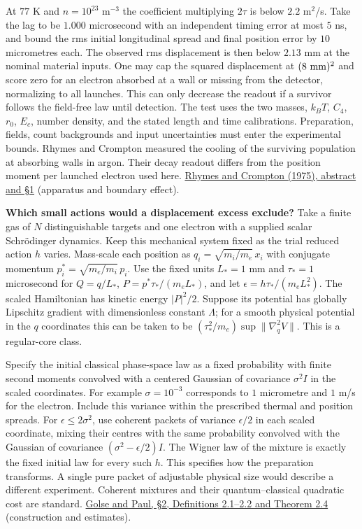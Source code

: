 \documentclass[11pt,a4paper]{article}
\begin{document}
At \(77\) K and \(n=10^{23}\) m\(^{-3}\) the coefficient multiplying
\(2\tau\) is below \(2.2\) m\(^2\)/s. Take the lag to be \(1.000\)
microsecond with an independent timing error at most \(5\) ns, and bound
the rms initial longitudinal spread and final position error by \(10\)
micrometres each. The observed rms displacement is then below \(2.13\)
mm at the nominal material inputs. One may cap the squared displacement
at \((8\ {\rm mm})^2\) and score zero for an electron absorbed at a wall
or missing from the detector, normalizing to all launches. This can only
decrease the readout if a survivor follows the field-free law until
detection. The test uses the two masses, \(k_BT\), \(C_4\), \(r_0\),
\(E_c\), number density, and the stated length and time calibrations.
Preparation, fields, count backgrounds and input uncertainties must
enter the experimental bounds. Rhymes and Crompton measured the cooling
of the surviving population at absorbing walls in argon. Their decay
readout differs from the position moment per launched electron used
here. \href{https://doi.org/10.1071/PH750675}{Rhymes and Crompton
(1975), abstract and §1} (apparatus and boundary effect).

\textbf{Which small actions would a displacement excess exclude?} Take a
finite gas of \(N\) distinguishable targets and one electron with a
supplied scalar Schrödinger dynamics. Keep this mechanical system fixed
as the trial reduced action \(h\) varies. Mass-scale each position as
\(q_i=\sqrt{m_i/m_e}\,x_i\) with conjugate momentum
\(p_i^*=\sqrt{m_e/m_i}\,p_i\). Use the fixed units \(L_*=1\) mm and
\(\tau_*=1\) microsecond for \(Q=q/L_*\), \(P=p^*\tau_* /(m_e L_*)\),
and let \(\epsilon=h\tau_* /(m_e L_*^2)\). The scaled Hamiltonian has
kinetic energy \(|P|^2/2\). Suppose its potential has globally Lipschitz
gradient with dimensionless constant \(\Lambda\); for a smooth physical
potential in the \(q\) coordinates this can be taken to be
\((\tau_*^2/m_e)\sup\|\nabla_q^2 V\|\). This is a regular-core class.

Specify the initial classical phase-space law as a fixed probability
with finite second moments convolved with a centered Gaussian of
covariance \(\sigma^2 I\) in the scaled coordinates. For example
\(\sigma=10^{-3}\) corresponds to \(1\) micrometre and \(1\) m/s for the
electron. Include this variance within the prescribed thermal and
position spreads. For \(\epsilon\le2\sigma^2\), use coherent packets of
variance \(\epsilon/2\) in each scaled coordinate, mixing their centres
with the same probability convolved with the Gaussian of covariance
\((\sigma^2-\epsilon/2)I\). The Wigner law of the mixture is exactly the
fixed initial law for every such \(h\). This specifies how the
preparation transforms. A single pure packet of adjustable physical size
would describe a different experiment. Coherent mixtures and their
quantum--classical quadratic cost are standard.
\href{https://arxiv.org/pdf/1510.06681}{Golse and Paul, §2, Definitions
2.1--2.2 and Theorem 2.4} (construction and estimates).
\end{document}
